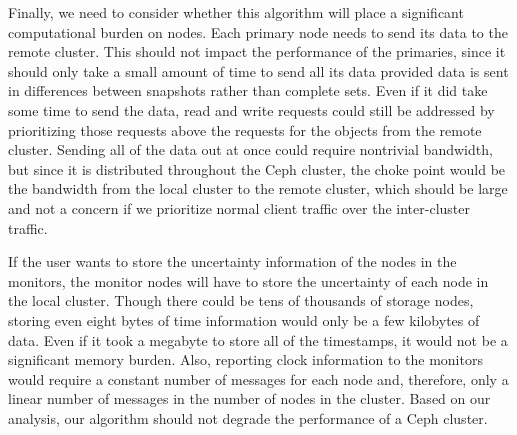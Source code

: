 Finally, we need to consider whether this algorithm will place a
significant computational burden on nodes. Each primary node needs to
send its data to the remote cluster. This should not impact the
performance of the primaries, since it should only take a small amount
of time to send all its data provided data is sent in differences
between snapshots rather than complete sets. Even if it did take some
time to send the data, read and write requests could still be
addressed by prioritizing those requests above the requests for the
objects from the remote cluster. Sending all of the data out at
once could require nontrivial bandwidth, but since it is distributed
throughout the Ceph cluster, the choke point would be the bandwidth
from the local cluster to the remote cluster, which should be large
and not a concern if we prioritize normal client traffic over the
inter-cluster traffic.

If the user wants to store the uncertainty information of the nodes in
the monitors, the monitor nodes will have to store the uncertainty of
each node in the local cluster. Though there could be tens of
thousands of storage nodes, storing even eight bytes of time
information would only be a few kilobytes of data. Even if it
took a megabyte to store all of the timestamps, it would not be a
significant memory burden. Also, reporting clock information to the
monitors would require a constant number of messages for each node
and, therefore, only a linear number of messages in the number of
nodes in the cluster.  Based on our analysis, our algorithm should not
degrade the performance of a Ceph cluster.
